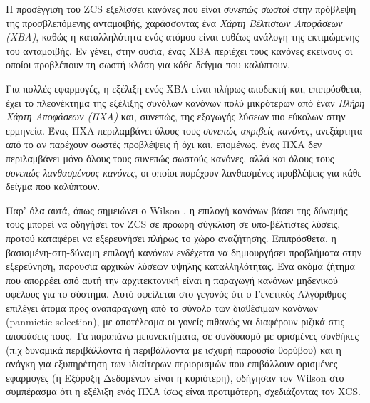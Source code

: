 Η προσέγγιση του ZCS εξελίσσει κανόνες που είναι \emph{συνεπώς σωστοί} στην πρόβλεψη της προσβλεπόμενης ανταμοιβής, χαράσσοντας ένα \emph{Χάρτη Βέλτιστων Αποφάσεων (ΧΒΑ)}, καθώς η καταλληλότητα ενός ατόμου είναι ευθέως ανάλογη της εκτιμώμενης του ανταμοιβής. Εν γένει, στην ουσία, ένας ΧΒΑ περιέχει τους κανόνες εκείνους οι οποίοι προβλέπουν τη σωστή κλάση για κάθε δείγμα που καλύπτουν.

Για πολλές εφαρμογές, η εξέλιξη ενός ΧΒΑ είναι πλήρως αποδεκτή και, επιπρόσθετα, έχει το πλεονέκτημα της εξέλιξης συνόλων κανόνων πολύ μικρότερων από έναν \emph{Πλήρη Χάρτη Αποφάσεων (ΠΧΑ)} και, συνεπώς, της εξαγωγής λύσεων πιο εύκολων στην ερμηνεία. Ένας ΠΧΑ περιλαμβάνει όλους τους \emph{συνεπώς ακριβείς κανόνες}, ανεξάρτητα από το αν παρέχουν σωστές προβλέψεις ή όχι και, επομένως, ένας ΠΧΑ δεν περιλαμβάνει μόνο όλους τους συνεπώς σωστούς κανόνες, αλλά και όλους τους \emph{συνεπώς λανθασμένους κανόνες}, οι οποίοι παρέχουν λανθασμένες προβλέψεις για κάθε δείγμα που καλύπτουν.

Παρ' όλα αυτά, όπως σημειώνει ο Wilson \cite{XCS}, η επιλογή κανόνων βάσει της δύναμής τους μπορεί να οδηγήσει τον ZCS σε πρόωρη σύγκλιση σε υπό-βέλτιστες λύσεις, προτού καταφέρει να εξερευνήσει πλήρως το χώρο αναζήτησης. Επιπρόσθετα, η βασισμένη-στη-δύναμη επιλογή κανόνων ενδέχεται να δημιουργήσει προβλήματα στην εξερεύνηση, παρουσία αρχικών λύσεων υψηλής καταλληλότητας. Ένα ακόμα ζήτημα που απορρέει από αυτή την αρχιτεκτονική είναι η παραγωγή κανόνων μηδενικού οφέλους για το σύστημα. Αυτό οφείλεται στο γεγονός ότι ο Γενετικός Αλγόριθμος επιλέγει άτομα προς αναπαραγωγή από το σύνολο των διαθέσιμων κανόνων (panmictic selection), με αποτέλεσμα οι γονείς πιθανώς να διαφέρουν ριζικά στις αποφάσεις τους. Τα παραπάνω μειονεκτήματα, σε συνδυασμό με ορισμένες συνθήκες (π.χ δυναμικά περιβάλλοντα ή περιβάλλοντα με ισχυρή παρουσία θορύβου) και η ανάγκη για εξυπηρέτηση των ιδιαίτερων περιορισμών που επιβάλλουν ορισμένες εφαρμογές (η Εξόρυξη Δεδομένων είναι η κυριότερη), οδήγησαν τον Wilson στο συμπέρασμα ότι η εξέλιξη ενός ΠΧΑ ίσως είναι προτιμότερη, σχεδιάζοντας τον XCS.

